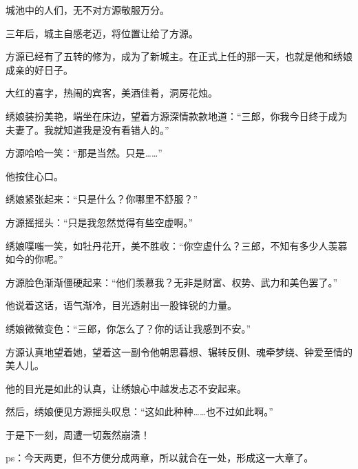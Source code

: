 \begin{this_body}
城池中的人们，无不对方源敬服万分。

三年后，城主自感老迈，将位置让给了方源。

方源已经有了五转的修为，成为了新城主。在正式上任的那一天，也就是他和绣娘成亲的好日子。

大红的喜字，热闹的宾客，美酒佳肴，洞房花烛。

绣娘装扮美艳，端坐在床边，望着方源深情款款地道：“三郎，你我今日终于成为夫妻了。我就知道我是没有看错人的。”

方源哈哈一笑：“那是当然。只是……”

他按住心口。

绣娘紧张起来：“只是什么？你哪里不舒服？”

方源摇摇头：“只是我忽然觉得有些空虚啊。”

绣娘噗嗤一笑，如牡丹花开，美不胜收：“你空虚什么？三郎，不知有多少人羡慕如今的你呢。”

方源脸色渐渐僵硬起来：“他们羡慕我？无非是财富、权势、武力和美色罢了。”

他说着这话，语气渐冷，目光透射出一股锋锐的力量。

绣娘微微变色：“三郎，你怎么了？你的话让我感到不安。”

方源认真地望着她，望着这一副令他朝思暮想、辗转反侧、魂牵梦绕、钟爱至情的美人儿。

他的目光是如此的认真，让绣娘心中越发忐忑不安起来。

然后，绣娘便见方源摇头叹息：“这如此种种……也不过如此啊。”

于是下一刻，周遭一切轰然崩溃！

ps：今天两更，但不方便分成两章，所以就合在一处，形成这一大章了。

\end{this_body}

